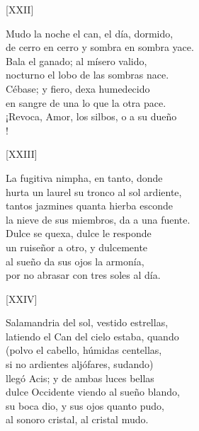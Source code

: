 \documentclass[11pt,a4paper,twoside]{article}
\begin{document}
%
\begin{center}
	[XXII]
\end{center}\pstart
Mudo la noche el can, el día, dormido,\\
de cerro en cerro y sombra en sombra yace.\\
Bala el ganado; al mísero valido,\\
nocturno el lobo de las sombras nace.\\
Cébase; y fiero, dexa humedecido\\
en sangre de una lo que la otra pace.\\
¡Revoca, Amor, los silbos, o a su dueño\\
!\par\pend
%
\begin{center}
	[XXIII]
\end{center}\pstart
La fugitiva nimpha, en tanto, donde\\
hurta un laurel su tronco al sol ardiente,\\
tantos jazmines quanta hierba esconde\\
la nieve de sus miembros, da a una fuente.\\
Dulce se quexa, dulce le responde\\
un ruiseñor a otro, y dulcemente\\
al sueño da sus ojos la armonía,\\
por no abrasar con tres soles al día.\par\pend
\relax
\vfill
\newpage
%
\begin{center}
	[XXIV]
\end{center}\pstart
Salamandria del sol, vestido estrellas,\\
latiendo el Can del cielo estaba, quando\\
(polvo el cabello, húmidas centellas,\\
si no ardientes aljófares, sudando)\\
llegó Acis; y de ambas luces bellas\\
dulce Occidente viendo al sueño blando,\\
su boca dio, y sus ojos quanto pudo,\\
al sonoro cristal, al cristal mudo.\par\pend
\end{document}
